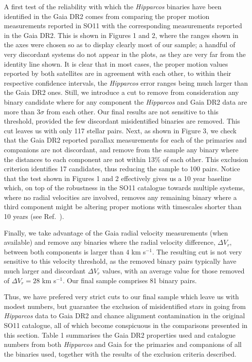 \documentclass{ws-ijmpd}
\begin{document}
A first test of the reliability with which the {\it Hipparcos} binaries have been identified in the Gaia DR2 comes from
comparing the proper motion measurements reported in SO11 with the corresponding measurements
reported in the Gaia DR2. This is shown in Figures 1 and 2, { where} the ranges shown in the axes were chosen so as to display
clearly most of our sample; a handful of very discordant systems do not appear in the plots, as they are very far from
the identity line shown. It is clear that in most cases, the proper motion values reported by both satellites are in agreement
with each other, to within their respective confidence intervals, the {\it Hipparcos} error ranges being much larger than the
Gaia DR2 ones. Still, we introduce a cut to remove from consideration any binary candidate { where} for any component the
{\it Hipparcos} and Gaia DR2 data are more than $3\sigma$ from each other. Our final results are not sensitive
to this threshold, provided the few discordant misidentified binaries are removed. This cut leaves us with only 117 stellar pairs.
Next, as shown in Figure 3, we check that the Gaia DR2 reported parallax measurements for each of the primaries and companions are
not discordant, and remove from the sample any binary where the distances to each component are not within 13\% of each other.
This exclusion criterion identifies 17 candidates, { thus reducing} the sample to 100 pairs. Notice that the
test shown in Figures 1 and 2 effectively gives us a 10 year baseline which, on top of the robustness in the SO11 catalogue
towards multiple systems, where no radial velocities are involved, removes any remaining binary where a third component might
be altering proper motions with timescales shorter than 10 years (see Ref.~).

Finally, we take advantage of the Gaia radial velocity measurements (when available) and remove any binaries where the radial
velocity difference, $\Delta V_{r}$, between both components is larger than $4$ { km s$^{-1}$}. The resulting cut is not very
sensitive to this velocity threshold, as the removed binary pairs typically have much larger and discordant $\Delta V_{r}$ values,
with an average value for those removed of $\Delta V_{r}=28$ { km s$^{-1}$}. Our final sample comprises 81 binary pairs.

Thus, we have prefered very strict cuts to our final sample which leave us with modest numbers, but guarantee the exclusion
of misidentified stars in going from {\it Hipparcos} data to Gaia DR2 and chance alignment contamination in the original
SO11 catalogue, all of which become conspicuous in the comparisons presented in this section. Table 1 summarises the Gaia DR2
properties used and catalogue numbers from both {\it Hipparcos} and Gaia for the primaries and companions of all the binaries used,
together with the results of the exclusion criteria described.
\end{document}
